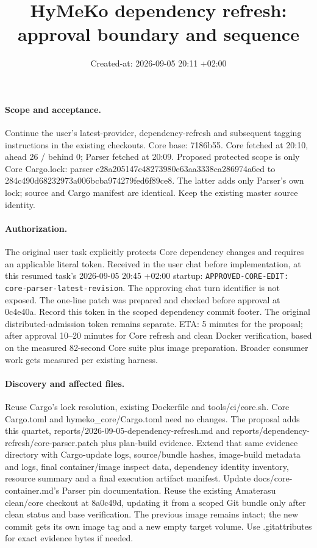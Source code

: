 \documentclass[11pt,a4paper]{article}
\title{HyMeKo dependency refresh: approval boundary and sequence}
\date{Created-at: 2026-09-05 20:11 +02:00}
\begin{document}
\maketitle
\paragraph{Scope and acceptance.}
Continue the user's latest-provider, dependency-refresh and subsequent tagging
instructions in the existing checkouts. Core base: 7186b55. Core fetched at 20:10,
ahead 26 / behind 0; Parser fetched at 20:09. Proposed protected scope is only
Core Cargo.lock: parser e28a205147c48273980e63aa3338ca286974a6ed to
284c490d68232973a006bcba974279fed6f89ce8. The latter adds only Parser's own lock;
source and Cargo manifest are identical. Keep the existing master source identity.
\paragraph{Authorization.}
The original user task explicitly protects Core dependency changes and requires
an applicable literal token. Received in the user chat before implementation,
at this resumed task's 2026-09-05 20:45 +02:00 startup:
\texttt{APPROVED-CORE-EDIT: core-parser-latest-revision}.
The approving chat turn identifier is not exposed. The one-line patch was
prepared and checked before approval at 0c4e40a. Record this token in the scoped
dependency commit footer. The original distributed-admission token remains separate.
ETA: 5 minutes for the proposal; after approval 10--20 minutes for Core refresh
and clean Docker verification, based on the measured 82-second Core suite plus
image preparation. Broader consumer work gets measured per existing harness.
\paragraph{Discovery and affected files.}
Reuse Cargo's lock resolution, existing Dockerfile and tools/ci/core.sh. Core
Cargo.toml and hymeko\_core/Cargo.toml need no changes. The proposal adds this
quartet, reports/2026-09-05-dependency-refresh.md and
reports/dependency-refresh/core-parser.patch plus plan-build evidence.
Extend that same evidence directory with Cargo-update logs, source/bundle hashes,
image-build metadata and logs, final container/image inspect data, dependency
identity inventory, resource summary and a final execution artifact manifest.
Update docs/core-container.md's Parser pin documentation. Reuse the existing
Amaterasu clean/core checkout at 8a0c49d, updating it from a scoped Git bundle
only after clean status and base verification. The previous image remains intact;
the new commit gets its own image tag and a new empty target volume.
Use .gitattributes for exact evidence bytes if needed.
\end{document}
